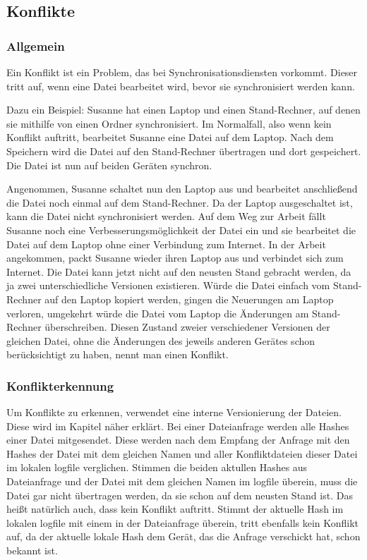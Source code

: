 \subsection{Konflikte}\label{Konflikt}
\subsubsection{Allgemein}
Ein Konflikt ist ein Problem, das bei Synchronisationsdiensten vorkommt. Dieser tritt auf, wenn eine Datei bearbeitet wird, bevor sie synchronisiert werden kann. 

Dazu ein Beispiel: Susanne hat einen Laptop und einen Stand-Rechner, auf denen sie mithilfe von \sblit einen Ordner synchronisiert. Im Normalfall, also wenn kein Konflikt auftritt, bearbeitet Susanne eine Datei auf dem Laptop. Nach dem Speichern wird die Datei auf den Stand-Rechner übertragen und dort gespeichert. Die Datei ist nun auf beiden Geräten synchron.

Angenommen, Susanne schaltet nun den Laptop aus und bearbeitet anschließend die Datei noch einmal auf dem Stand-Rechner. Da der Laptop ausgeschaltet ist, kann die Datei nicht synchronisiert werden. Auf dem Weg zur Arbeit fällt Susanne noch eine Verbesserungsmöglichkeit der Datei ein und sie bearbeitet die Datei auf dem Laptop ohne einer Verbindung zum Internet. In der Arbeit angekommen, packt Susanne wieder ihren Laptop aus und verbindet sich zum Internet. Die Datei kann jetzt nicht auf den neusten Stand gebracht werden, da ja zwei unterschiedliche Versionen existieren. Würde die Datei einfach vom Stand-Rechner auf den Laptop kopiert werden, gingen die Neuerungen am Laptop verloren, umgekehrt würde die Datei vom Laptop die Änderungen am Stand-Rechner überschreiben. Diesen Zustand zweier verschiedener Versionen der gleichen Datei, ohne die Änderungen des jeweils anderen Gerätes schon berücksichtigt zu haben, nennt man einen Konflikt.

\subsubsection{Konflikterkennung}\label{Konflikterkennung}
Um Konflikte zu erkennen, verwendet \sblit eine interne Versionierung der Dateien. Diese wird im Kapitel  näher erklärt. Bei einer Dateianfrage  werden alle Hashes einer Datei mitgesendet. Diese werden nach dem Empfang der Anfrage mit den Hashes der Datei mit dem gleichen Namen und aller Konfliktdateien dieser Datei im lokalen \gls{logfile} verglichen. Stimmen die beiden aktullen Hashes aus Dateianfrage und der Datei mit dem gleichen Namen im \gls{logfile} überein, muss die Datei gar nicht übertragen werden, da sie schon auf dem neusten Stand ist. Das heißt natürlich auch, dass kein Konflikt auftritt. Stimmt der aktuelle Hash im lokalen \gls{logfile} mit einem in der Dateianfrage überein, tritt ebenfalls kein Konflikt auf, da der aktuelle lokale Hash dem Gerät, das die Anfrage verschickt hat, schon bekannt ist. 

